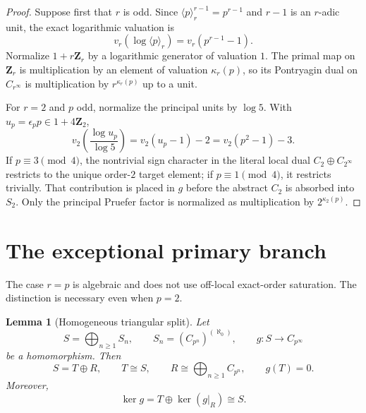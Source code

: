\documentclass[11pt]{article}
\newtheorem{lemma}[theorem]{Lemma}
\theoremstyle{definition}
\begin{document}
\begin{proof}
Suppose first that $r$ is odd.  Since
$\langle p\rangle_r^{r-1}=p^{r-1}$ and $r-1$ is an $r$-adic unit,
the exact logarithmic valuation is
\[
v_r(\log\langle p\rangle_r)=v_r(p^{r-1}-1).
\]
Normalize $1+r\mathbf Z_r$ by a logarithmic generator of valuation $1$.
The primal map on $\mathbf Z_r$ is multiplication by an element of valuation
$\kappa_r(p)$, so its Pontryagin dual on $C_{r^\infty}$ is multiplication by
$r^{\kappa_r(p)}$ up to a unit.

For $r=2$ and $p$ odd, normalize the principal units by $\log 5$.  With
$u_p=\epsilon_pp\in1+4\mathbf Z_2$,
\begin{equation}\label{eq:two-kappa}
v_2\!\left(\frac{\log u_p}{\log5}\right)
=v_2(u_p-1)-2
=v_2(p^2-1)-3.
\end{equation}
If $p\equiv3\pmod4$, the nontrivial sign character in the literal local dual
$C_2\oplus C_{2^\infty}$ restricts to the unique order-$2$ target element;
if $p\equiv1\pmod4$, it restricts trivially.  That contribution is placed in
$g$ before the abstract $C_2$ is absorbed into $S_2$.  Only the principal
Pruefer factor is normalized as multiplication by $2^{\kappa_2(p)}$.
\end{proof}

\section{The exceptional primary branch}\label{sec:diagonal}

The case $r=p$ is algebraic and does not use off-local exact-order saturation.
The distinction is necessary even when $p=2$.

\begin{lemma}[Homogeneous triangular split]\label{lem:triangular}
Let
\[
S=\bigoplus_{n\ge1}S_n,
\qquad S_n=(C_{p^n})^{(\aleph_0)},
\qquad g:S\longrightarrow C_{p^\infty}
\]
be a homomorphism.  Then
\begin{equation}\label{eq:triangular-split}
S=T\oplus R,
\qquad T\cong S,
\qquad R\cong\bigoplus_{n\ge1}C_{p^n},
\qquad g(T)=0.
\end{equation}
Moreover,
\begin{equation}\label{eq:kernel-split}
\ker g=T\oplus\ker(g|_R)\cong S.
\end{equation}
\end{lemma}
\end{document}
